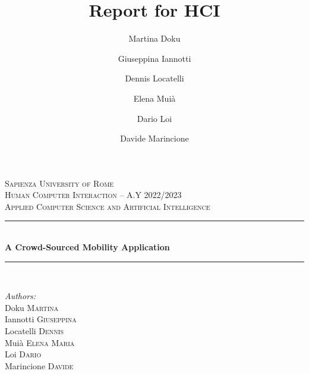 \documentclass[a4paper, 11pt]{report}
\author{Martina Doku \and Giuseppina Iannotti \and Dennis Locatelli \and Elena Muià \and Dario Loi \and Davide Marincione}
\title{\Huge Report for HCI} %
\begin{document}
\begin{titlepage} %
	\newcommand{\HRule}{\rule{\linewidth}{0.5mm}} %

	\center%


	\textsc{\LARGE Sapienza University of Rome}\\[1.5cm] %

	\textsc{\Large Human Computer Interaction -- A.Y 2022/2023}\\[0.5cm] %

	\textsc{\large Applied Computer Science and Artificial Intelligence}\\[0.5cm] %


	\HRule\\[0.4cm]

	{\huge\bfseries A Crowd-Sourced Mobility Application}\\[0.4cm] %

	\HRule\\[1.5cm]


	\begin{minipage}{0.4\textwidth}
		\begin{flushleft}
			\Large
			\textit{Authors:}\\[3pt]\hspace{2pt} %
			Doku \textsc{Martina}\\[1pt]\hspace{2pt}
			Iannotti \textsc{Giuseppina}\\[1pt]\hspace{2pt}
			Locatelli \textsc{Dennis}\\[1pt]\hspace{2pt}
			Muià \textsc{Elena Maria}\\[1pt]\hspace{2pt}
			Loi \textsc{Dario}\\[1pt]\hspace{2pt}
			Marincione \textsc{Davide}
		\end{flushleft}
	\end{minipage}
	\begin{minipage}{0.4\textwidth}
		\begin{flushright}
		\end{flushright}
	\end{minipage}


\end{titlepage}
\end{document}
